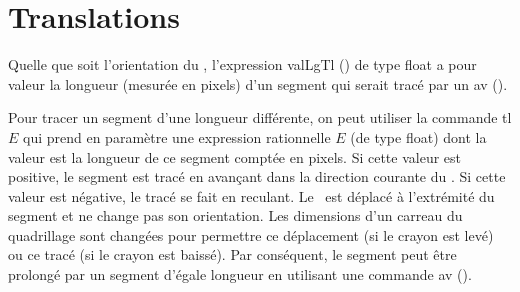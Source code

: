 \section{Translations}
Quelle que soit l'orientation du \robot, l'expression  {\idt valLgTl ()} de type {\idt float} a pour valeur la longueur
 (mesurée en pixels) d'un segment qui serait tracé par un {\idt av ()}. 
 
 Pour tracer un segment d'une longueur différente, on peut utiliser la commande {\idt tl} $E$ qui 
 prend en paramètre une expression rationnelle $E$ (de type {\idt float}) dont la valeur est la 
 longueur de ce segment 
 comptée en pixels. Si cette valeur est positive, le segment est tracé en avançant dans la 
 direction courante du \robot. Si cette valeur est négative, le tracé se fait en reculant. Le \robot\
 est déplacé à l'extrémité du segment et ne change pas son orientation. Les dimensions
 d'un carreau du quadrillage sont changées pour permettre ce déplacement (si le crayon est levé)
 ou ce tracé (si le crayon est baissé). Par conséquent, le segment peut être prolongé
 par un segment d'égale longueur en utilisant une commande {\idt av ()}.
 
